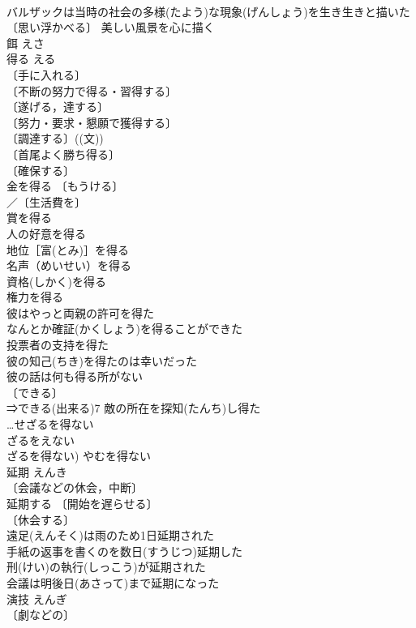 \documentclass[8pt]{extreport}
\begin{document}
\begin{CJK}{UTF8}{min}
\\	バルザックは当時の社会の多様(たよう)な現象(げんしょう)を生き生きと描いた 
\\	〔思い浮かべる〕 美しい風景を心に描く 
\\	餌	えさ	
\\	得る	える	
\\	〔手に入れる〕
\\	〔不断の努力で得る・習得する〕
\\	〔遂げる，達する〕
\\	〔努力・要求・懇願で獲得する〕
\\	〔調達する〕((文)) 
\\	〔首尾よく勝ち得る〕
\\	〔確保する〕
\\	金を得る 〔もうける〕
\\	／〔生活費を〕
\\	賞を得る 
\\	人の好意を得る 
\\	地位［富(とみ)］を得る 
\\	名声（めいせい）を得る 
\\	資格(しかく)を得る 
\\	権力を得る 
\\	彼はやっと両親の許可を得た 
\\	なんとか確証(かくしょう)を得ることができた 
\\	投票者の支持を得た 
\\	彼の知己(ちき)を得たのは幸いだった 
\\	彼の話は何も得る所がない 
\\	〔できる〕
\\	⇒できる(出来る)7 敵の所在を探知(たんち)し得た 
\\	…せざるを得ない 
\\	ざるをえない
\\	ざるを得ない) やむを得ない 
\\	延期	えんき	
\\	〔会議などの休会，中断〕
\\	延期する 〔開始を遅らせる〕
\\	〔休会する〕
\\	遠足(えんそく)は雨のため1日延期された 
\\	手紙の返事を書くのを数日(すうじつ)延期した 
\\	刑(けい)の執行(しっこう)が延期された 
\\	会議は明後日(あさって)まで延期になった 
\\	演技	えんぎ	
\\	〔劇などの〕

\end{CJK}
\end{document}
